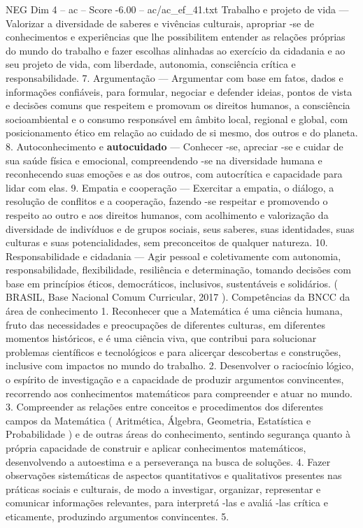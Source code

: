 \begin{textsample}{NEG Dim 4 – ac – Score -6.00 – ac/ac\_ef\_41.txt}
Trabalho e projeto de vida — Valorizar a diversidade de saberes e vivências culturais, apropriar -se de conhecimentos e experiências que lhe possibilitem entender as relações próprias do mundo do trabalho e fazer escolhas alinhadas ao exercício da cidadania e ao seu projeto de vida, com liberdade, autonomia, consciência crítica e responsabilidade. 7.
Argumentação — Argumentar com base em fatos, dados e informações confiáveis, para formular, negociar e defender ideias, pontos de vista e decisões comuns que respeitem e promovam os direitos humanos, a consciência socioambiental e o consumo responsável em âmbito local, regional e global, com posicionamento ético em relação ao cuidado de si mesmo, dos outros e do planeta. 8.
Autoconhecimento e \textbf{autocuidado} — Conhecer -se, apreciar -se e cuidar de sua saúde física e emocional, compreendendo -se na diversidade humana e reconhecendo suas emoções e as dos outros, com autocrítica e capacidade para lidar com elas. 9.
Empatia e cooperação — Exercitar a empatia, o diálogo, a resolução de conflitos e a cooperação, fazendo -se respeitar e promovendo o respeito ao outro e aos direitos humanos, com acolhimento e valorização da diversidade de indivíduos e de grupos sociais, seus saberes, suas identidades, suas culturas e suas potencialidades, sem preconceitos de qualquer natureza. 10.
Responsabilidade e cidadania — Agir pessoal e coletivamente com autonomia, responsabilidade, flexibilidade, resiliência e determinação, tomando decisões com base em princípios éticos, democráticos, inclusivos, sustentáveis e solidários. ( BRASIL, Base Nacional Comum Curricular, 2017 ).
Competências da BNCC da área de conhecimento 1.
Reconhecer que a Matemática é uma ciência humana, fruto das necessidades e preocupações de diferentes culturas, em diferentes momentos históricos, e é uma ciência viva, que contribui para solucionar problemas científicos e tecnológicos e para alicerçar descobertas e construções, inclusive com impactos no mundo do trabalho. 2.
Desenvolver o raciocínio lógico, o espírito de investigação e a capacidade de produzir argumentos convincentes, recorrendo aos conhecimentos matemáticos para compreender e atuar no mundo. 3.
Compreender as relações entre conceitos e procedimentos dos diferentes campos da Matemática ( Aritmética, Álgebra, Geometria, Estatística e Probabilidade ) e de outras áreas do conhecimento, sentindo segurança quanto à própria capacidade de construir e aplicar conhecimentos matemáticos, desenvolvendo a autoestima e a perseverança na busca de soluções. 4.
Fazer observações sistemáticas de aspectos quantitativos e qualitativos presentes nas práticas sociais e culturais, de modo a investigar, organizar, representar e comunicar informações relevantes, para interpretá -las e avaliá -las crítica e eticamente, produzindo argumentos convincentes. 5.

\end{textsample}
